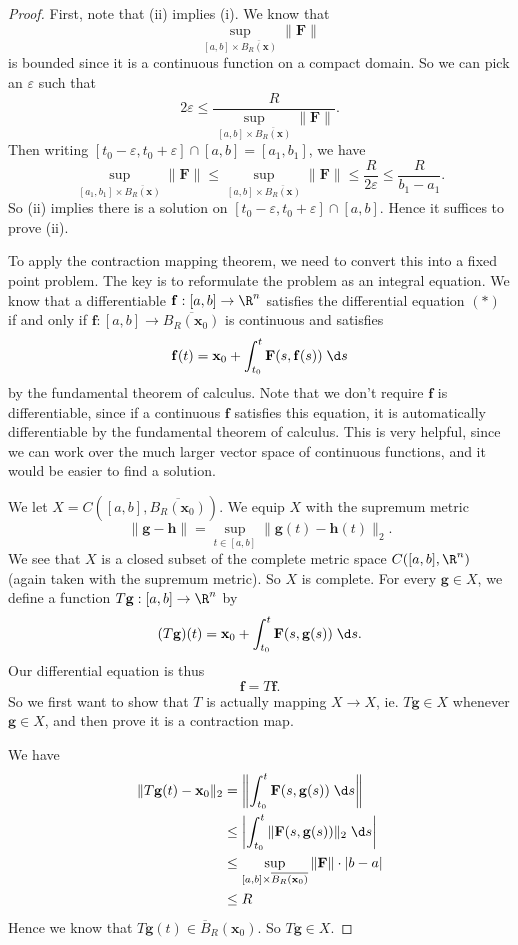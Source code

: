 \documentclass[a4paper]{article}
\begin{document}
\begin{proof}
  First, note that (ii) implies (i). We know that
  \[
    \sup_{[a, b]\times \overline{B_R(\mathbf{x})}}\|\mathbf{F}\|
  \]
  is bounded since it is a continuous function on a compact domain. So we can pick an $\varepsilon$ such that
  \[
    2\varepsilon \leq \frac{R}{\sup_{[a, b]\times \overline{B_R(\mathbf{x})}}\|\mathbf{F}\|}.
  \]
  Then writing $[t_0 - \varepsilon, t_0 + \varepsilon] \cap [a, b] = [a_1, b_1]$, we have
  \[
    \sup_{[a_1, b_1]\times \overline{B_R(\mathbf{x})}}\|\mathbf{F}\| \leq \sup_{[a, b]\times \overline{B_R(\mathbf{x})}}\|\mathbf{F}\| \leq \frac{R}{2\varepsilon} \leq \frac{R}{b_1 - a_1}.
  \]
  So (ii) implies there is a solution on $[t_0 - \varepsilon, t_0 + \varepsilon] \cap [a, b]$. Hence it suffices to prove (ii).

  To apply the contraction mapping theorem, we need to convert this into a fixed point problem. The key is to reformulate the problem as an integral equation. We know that a differentiable $\mathbf{f}: [a, b] \to \R^n$ satisfies the differential equation $(*)$ if and only if $\mathbf{f}: [a, b] \to \overline{B_R(\mathbf{x}_0)}$ is continuous and satisfies
  \[
    \mathbf{f}(t) = \mathbf{x}_0 + \int_{t_0}^t \mathbf{F}(s, \mathbf{f}(s))\;\d s
  \]
  by the fundamental theorem of calculus. Note that we don't require $\mathbf{f}$ is differentiable, since if a continuous $\mathbf{f}$ satisfies this equation, it is automatically differentiable by the fundamental theorem of calculus. This is very helpful, since we can work over the much larger vector space of continuous functions, and it would be easier to find a solution.

  We let $X = C([a, b], \overline{B_R(\mathbf{x}_0)})$. We equip $X$ with the supremum metric
  \[
    \|\mathbf{g} - \mathbf{h}\| = \sup_{t \in [a, b]} \|\mathbf{g}(t) - \mathbf{h}(t)\|_2.
  \]
  We see that $X$ is a closed subset of the complete metric space $C([a, b] , \R^n)$ (again taken with the supremum metric). So $X$ is complete. For every $\mathbf{g} \in X$, we define a function $T\mathbf{g}: [a, b] \to \R^n$ by
  \[
    (T\mathbf{g}) (t) = \mathbf{x}_0 + \int_{t_0}^t \mathbf{F}(s, \mathbf{g}(s))\;\d s.
  \]
  Our differential equation is thus
  \[
    \mathbf{f} = T\mathbf{f}.
  \]
  So we first want to show that $T$ is actually mapping $X \to X$, ie. $T\mathbf{g} \in X$ whenever $\mathbf{g} \in X$, and then prove it is a contraction map.

  We have
  \begin{align*}
    \|T\mathbf{g}(t) - \mathbf{x}_0\|_2 &= \left\|\int_{t_0}^t \mathbf{F}(s, \mathbf{g}(s))\;\d s\right\|\\
    &\leq \left|\int_{t_0}^t \|\mathbf{F} (s, \mathbf{g}(s))\|_2\;\d s\right|\\
    &\leq \sup_{[a, b] \times \overline{B_R(\mathbf{x}_0)}} \|\mathbf{F}\| \cdot |b - a|\\
    &\leq R
  \end{align*}
  Hence we know that $T\mathbf{g}(t) \in \overline{B}_R(\mathbf{x}_0)$. So $T \mathbf{g} \in X$.


\end{proof}
\end{document}
